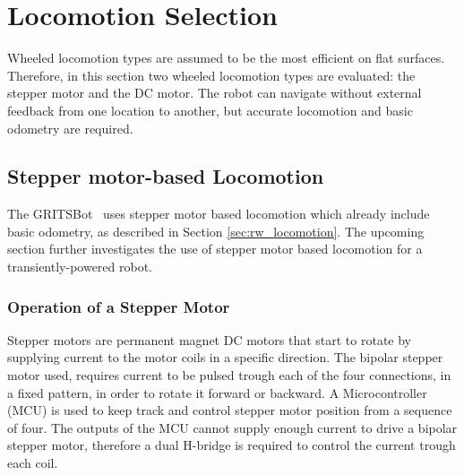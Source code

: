 \section{Locomotion Selection}
\label{sec:pre_locomotion_selection}

Wheeled locomotion types are assumed to be the most efficient on flat surfaces.
Therefore, in this section two wheeled locomotion types are evaluated: the stepper motor and the DC motor.
The robot can navigate without external feedback from one location to another, but accurate locomotion and basic odometry are required.

\subsection{Stepper motor-based Locomotion}

The GRITSBot~\cite{pickem_icra_2015} uses stepper motor based locomotion which already include basic odometry, as described in Section \ref{sec:rw_locomotion}.
The upcoming section further investigates the use of stepper motor based locomotion for a transiently-powered robot.

\subsubsection{Operation of a Stepper Motor}
Stepper motors are permanent magnet DC motors that start to rotate by supplying current to the motor coils in a specific direction.
The bipolar stepper motor used, requires current to be pulsed trough each of the four connections, in a fixed pattern, in order to rotate it forward or backward.
A Microcontroller (MCU) is used to keep track and control stepper motor position from a sequence of four.
The outputs of the MCU cannot supply enough current to drive a bipolar stepper motor, therefore a dual H-bridge is required to control the current trough each coil.


